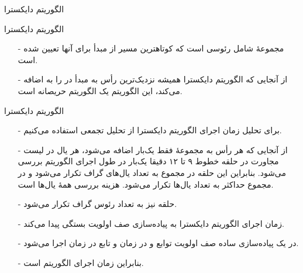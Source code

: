\begin{frame}{‌الگوریتم دایکسترا}
\LR{
\begin{figure}[!ht]
  {}
 {}
 {}
  {}
  {}
  {}
 {}
  {}

  \label{fig:d1}
\end{figure}
}

\end{frame}



\begin{frame}{‌الگوریتم دایکسترا}
\begin{itemize}\itemr
\item[-]
مجموعهٔ 
شامل رئوسی است که کوتاهترین مسیر از مبدأ برای آنها تعیین شده است.
\item[-]
از آنجایی که الگوریتم دایکسترا همیشه نزدیک‌ترین رأس به مبدأ در
را به
اضافه می‌کند، این الگوریتم یک الگوریتم حریصانه است.
\end{itemize}
\end{frame}


\begin{frame}{‌الگوریتم دایکسترا}
\begin{itemize}\itemr
\item[-]
برای تحلیل زمان اجرای الگوریتم دایکسترا از تحلیل تجمعی استفاده می‌کنیم.
\item[-]
از آنجایی که هر رأس
به مجموعهٔ
فقط یک‌بار اضافه می‌شود، هر یال در لیست مجاورت
در حلقه
خطوط ۹ تا ۱۲ دقیقا یک‌بار در طول اجرای الگوریتم بررسی می‌شود.
بنابراین این حلقه در مجموع
به تعداد یال‌های گراف
تکرار می‌شود و
در مجموع حداکثر
به تعداد یال‌ها
تکرار می‌شود.
هزینه بررسی همهٔ یال‌ها
است.
\item[-]
حلقه
نیز به تعداد رئوس گراف تکرار می‌شود.
\item[-]
زمان اجرای الگوریتم دایکسترا به پیاده‌سازی صف اولویت بستگی پیدا می‌کند.
\item[-]
در یک پیاده‌سازی ساده صف اولویت توابع
و
در زمان
و تابع
در زمان
اجرا می‌شود.
\item[-]
بنابراین زمان اجرای الگوریتم
است.
\end{itemize}
\end{frame}



